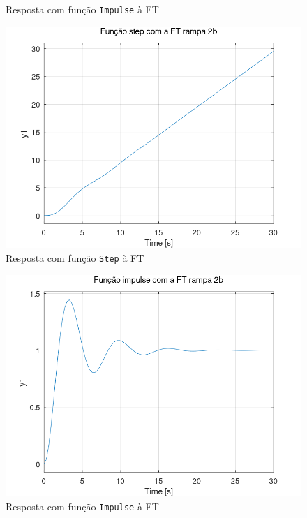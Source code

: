 \documentclass[a4paper,12pt]{article}
\begin{document}
\begin{enumerate}
\begin{enumerate}
\begin{figure}[h]
                \caption{Resposta com função \texttt{Impulse} à FT}
                \label{fig2aImpulse}
            \end{figure}
            \begin{figure}[h]
                \centering
                \includegraphics[scale=0.4]{../fig/fig2bStep.png}
                \caption{Resposta com função \texttt{Step} à FT}
                \label{fig2bStep}
            \end{figure}
            \begin{figure}[h]
                \centering
                \includegraphics[scale=0.4]{../fig/fig2bImpulse.png}
                \caption{Resposta com função \texttt{Impulse} à FT}
                \label{fig2bImpulse}
            \end{figure}


\end{enumerate}
\end{enumerate}
\end{document}
